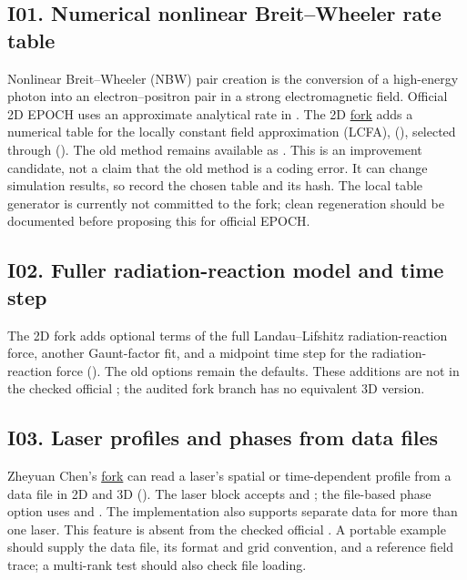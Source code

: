\subsection*{I01. Numerical nonlinear Breit--Wheeler rate table}
\label{imp:I01}
Nonlinear Breit--Wheeler (NBW) pair creation is the conversion of a
high-energy photon into an electron--positron pair in a strong
electromagnetic field. Official 2D EPOCH uses an approximate
analytical rate in . The 2D
\href{https://github.com/ZheyuanChen/epoch_dev}{fork} adds a
numerical table for the locally constant field approximation
(LCFA), 
(), selected through
 ().
The old method remains available as .
This is an improvement candidate, not a claim that the old
method is a coding error. It can change simulation results,
so record the chosen table and its hash. The local table
generator is currently not committed to the fork; clean
regeneration should be documented before proposing this
for official EPOCH.

\subsection*{I02. Fuller radiation-reaction model and time step}
\label{imp:I02}
The 2D fork adds optional terms of the full
Landau--Lifshitz radiation-reaction force, another
Gaunt-factor fit, and a midpoint time step for the
radiation-reaction force ().
The old options remain the defaults. These additions
are not in the checked official ; the
audited fork branch has no equivalent 3D version.

\subsection*{I03. Laser profiles and phases from data files}
\label{imp:I03}
Zheyuan Chen's \href{https://github.com/ZheyuanChen/epoch_dev}{fork}
can read a laser's spatial or time-dependent profile from a data
file in 2D and 3D (). The laser block accepts
 and ; the
file-based phase option uses  and
. The implementation also supports separate
data for more than one laser. This feature is absent from the
checked official . A portable example should supply
the data file, its format and grid convention, and a reference
field trace; a multi-rank test should also check file loading.

